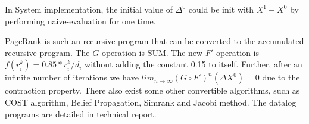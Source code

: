 In System implementation, the initial value of $\Delta^0$ could be init with $X^1-X^0$ by performing naive-evaluation for one time. 
 
PageRank is such an recursive program that can be converted to the accumulated recursive program. The $G$ operation is SUM. The new $F'$ operation is $f(r_i^k)=0.85*r_i^k/d_i$ without adding the constant 0.15 to itself. Further, after an infinite number of iterations we have $lim_{n\rightarrow\infty}(G\circ F')^n(\Delta X^0)=0$ due to the contraction property. There also exist some other convertible algorithms, such as COST algorithm, Belief Propagation, Simrank and Jacobi method. The datalog programs are detailed in technical report\cite{fullversion}. 




\begin{comment}
The key of the conversion is to incrementally compute the origin problem and the difference value $\Delta X^k$ of each recursion can be iteratively computed i.e.
 
\begin{equation}
\label{eq:con}
\begin{aligned}
X^{k+1}=&X^k+\Delta X^k\\
\Delta X^{k}=&G' \circ F' (\Delta X^{k-1}).
\end{aligned}
\end{equation}
if aggregate function $G'$ satisfied the \textbf{accumulative} condition, the first line of equation \ref{eq:con} can be rewrite as $X^{k+1}=G'(X^0\cup \Delta X^0\cup \Delta X^1 \ldots \Delta X^k)$.%
This is the basic formula of accumulative recursive aggregation which has the same result with normal recursive aggregation .Algorithm can be correctly asynchronized if the \textbf{order-independent} conditions satisfied. Though the basic idea has been proposed,there are still two key problems to be solved. First, how to determine the new aggregation function $G'$. Second,How to determine the incremental value $\Delta X^k$ from $X^k$ and $X^{k+1}$.
Third, how to initialize the incremental value $\Delta X^0$.


Since the new aggregation $G'$ express the relationship between $\Delta X^k$ and $\Delta X^{k-1}$. So the relation can be obtained by evaluate the incremental value between two adjacent recursion. First define the calculation of incremental value as $\Delta X^{k}=diff(X^{k+1},X^{k})$ in which $diff( \cdot , \cdot )$ is a inverse transformation of $G'$, i.e., $X^{k+1}=G'(X^k \cup diff(X^{k+1},X^{k}))$. Then we can try to find a $G'$ satisfied that $diff(G\circ F(X^{k+1}),G \circ F(X^{k})) = G'\circ F(diff(X^{k+1},X^{k}))$. If $G'$ exists and satisfied the community condition, the original algorithm  can be converted. Otherwise, the algorithm can't be converted. 


\end{comment}
